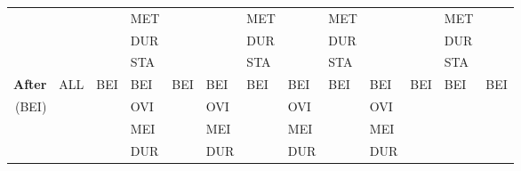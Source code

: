 \documentclass[11pt]{report}
\newenvironment{vvarmargin}[2]
{
  \begin{list}{}
  {
    \setlength{\topsep}{0pt}
    \setlength{\leftmargin}{0pt}
    \setlength{\rightmargin}{0pt}
    \setlength{\listparindent}{\parindent}
    \setlength{\itemindent}{\parindent}
    \setlength{\parsep}{0pt plus 1pt}
    \addtolength{\leftmargin}{#1}\addtolength{\rightmargin}{#2}
  }
  \item
}
{
  \end{list}
}
\begin{document}
\begin{table}[p]
\begin{vvarmargin}{-4cm}{-4cm}
\begin{center}
\begin{tabular}[t]{|r|l|l|l|l|l|l|l|l|l|l|l|l|}
                                        &                         &                         & MET                     &                         &                         & MET                     &                         & MET                     &                         &                         & MET                     &                         \\
                                        &                         &                         & DUR                     &                         &                         & DUR                     &                         & DUR                     &                         &                         & DUR                     &                         \\
                                        &                         &                         & STA                     &                         &                         & STA                     &                         & STA                     &                         &                         & STA                     &                         \\
                \hline
                \textbf{After}          & ALL                     & BEI                     & BEI                     & BEI                     & BEI                     & BEI                     & BEI                     & BEI                     & BEI                     & BEI                     & BEI                     & BEI                     \\
                (BEI)                   &                         &                         & OVI                     &                         & OVI                     &                         & OVI                     &                         & OVI                     &                         &                         &                         \\
                                        &                         &                         & MEI                     &                         & MEI                     &                         & MEI                     &                         & MEI                     &                         &                         &                         \\
                                        &                         &                         & DUR                     &                         & DUR                     &                         & DUR                     &                         & DUR                     &                         &                         &                         \\

\end{tabular}
\end{center}
\end{vvarmargin}
\end{table}
\end{document}
